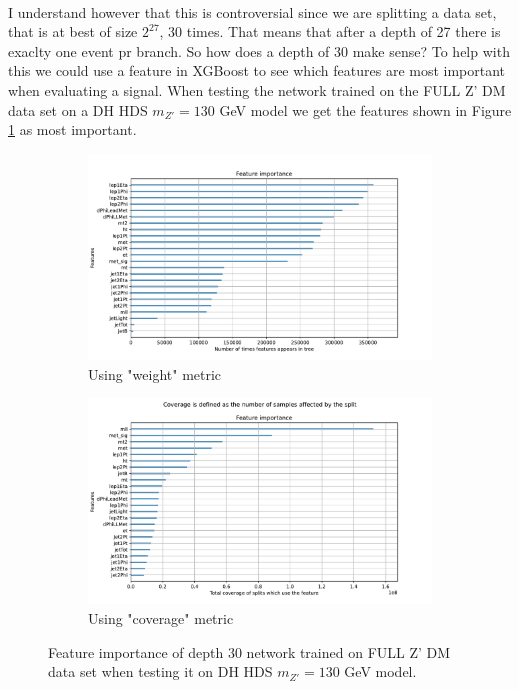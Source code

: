 \documentclass[12pt, a4paper]{book}
\begin{document}
\\ I understand however that this is controversial since we are splitting a data set, that is at best of size $2^{27}$, 30 times. That means that after a depth of 27 there is exaclty one event pr branch.
So how does a depth of 30 make sense? To help with this we could use a feature in XGBoost to see which features are most important when evaluating a signal. 
When testing the network trained on the FULL Z' DM data set on a DH HDS $m_{Z'}=130$ GeV model we get the features shown in Figure \ref{fig:DBDT_feat} as most important. 
\graphicspath{{../../Plots/XGBoost/FULL/DH_HDS_mZp_130/feature_importance}}
\begin{figure}[!ht]
	\centering
   \begin{subfigure}[b]{0.8\textwidth}
      \centering
      \includegraphics[width=1\textwidth]{weight.pdf}
      \caption{Using "weight" metric}
   \end{subfigure}
   \hfill
   \begin{subfigure}[b]{0.8\textwidth}
      \centering
      \includegraphics[width=1\textwidth]{total_cover.pdf}
      \caption{Using "coverage" metric}
   \end{subfigure}
   \caption{Feature importance of depth 30 network trained on FULL Z' DM data set when testing it on DH HDS $m_{Z'}=130$ GeV model.}\label{fig:DBDT_feat}
\end{figure}
\end{document}
